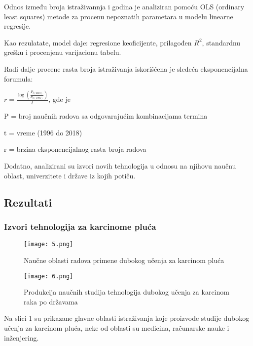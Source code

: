 \documentclass[a4paper]{article}
\begin{document}
Odnos između broja istraživannja i godina je analiziran pomoću OLS (ordinary least squares) metode za procenu nepoznatih parametara u modelu linearne regresije.

Kao rezulatate, model daje: regresione keoficijente, prilagođen \begin{math}R^2\end{math}, standardnu grešku i procenjenu varijacionu tabelu.

Radi dalje procene rasta broja istraživanja iskorišćena je sledeća eksponencijalna forumula:

\begin{math}r = \frac{\log(\frac{P_{t(2018)}}{P_{0(1996)}})}{t}\end{math}, gde je

P = broj naučnih radova sa odgovarajućim kombinacijama termina

t = vreme (1996 do 2018)

r = brzina eksponencijalnog rasta broja radova

\bigskip

Dodatno, analizirani su izvori novih tehnologija u odnosu na njihovu naučnu oblast, univerzitete i države iz kojih potiču.


\subsection{Rezultati}
\label{subsec:podnaslov4}

\FloatBarrier
\subsubsection{Izvori tehnologija za karcinome pluća}
\label{subsec:ppnaslov2}



\begin{figure}[hbt!]
\centering
\texttt{[image: 5.png]}
\caption{Naučne oblasti radova primene dubokog učenja za karcinom pluća}
\end{figure}


\begin{figure}[hbt!]
\centering
\texttt{[image: 6.png]}
\caption{Produkcija naučnih studija tehnologija dubokog učenja za karcinom raka po državama}
\end{figure}


Na slici 1 su prikazane glavne oblasti istraživanja koje proizvode studije dubokog učenja za karcinom pluća, neke od oblasti su medicina, računarske nauke i inženjering.
\end{document}
